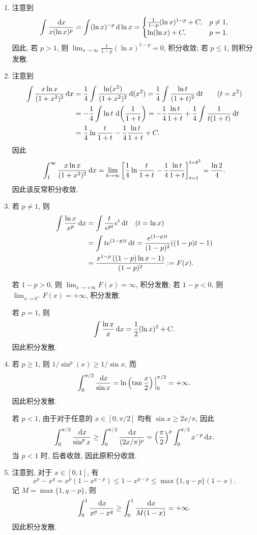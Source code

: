 \documentclass{article}
\begin{document}
\begin{solution}
  \begin{enumerate}[label=(\alph*)]
    \item 注意到
    \[ \int \frac{\,\mathrm{d} x}{x(\ln x)^p} = \int (\ln x)^{-p}\,\mathrm{d} \ln x
    =\begin{cases}
    \frac{1}{1-p}(\ln x)^{1-p}+C, & p\neq 1, \\
    \ln(\ln x)+C, & p=1.
    \end{cases} \]
    因此, 若 \( p>1 \), 则 \( \lim_{x\to\infty} \frac{1}{1-p}(\ln x)^{1-p} = 0 \), 积分收敛; 若 \( p\leq 1 \), 则积分发散.
    \item 注意到
    \begin{align*}
      \int \frac{x\ln x}{(1+x^2)^2}\,\mathrm{d} x
      &= \frac{1}{4} \int \frac{\ln(x^2)}{(1+x^2)^2}\,\mathrm{d}(x^2)
      = \frac{1}{4} \int \frac{\ln t}{(1+t)^2}\,\mathrm{d} t \qquad (t=x^2) \\
      &= -\frac{1}{4} \int \ln t\,\,\mathrm{d}\!\left(\frac{1}{1+t}\right)
      = -\frac{1}{4} \frac{\ln t}{1+t} + \frac{1}{4} \int \frac{1}{t(1+t)}\,\mathrm{d} t \\
      &= \frac{1}{4} \ln \frac{t}{1+t} - \frac{1}{4} \frac{\ln t}{1+t} + C.
    \end{align*}
    因此
    \[
      \int_1^\infty \frac{x\ln x}{(1+x^2)^2}\,\mathrm{d} x
      = \lim_{b\to\infty} \left[\frac{1}{4} \ln \frac{t}{1+t} - \frac{1}{4} \frac{\ln t}{1+t}\right]_{t=1}^{t=b^2}
      = \frac{\ln 2}{4}.
    \]
    因此该反常积分收敛.
    \item 若 \( p\neq 1 \), 则
    \begin{align*}
      \int \frac{\ln x}{x^{p}}\,\mathrm{d} x
      &=\int \frac{t}{e^{p t}}e^{t}\,\mathrm{d} t\quad (t=\ln x) \\
      &=\int te^{(1-p)t}\,\mathrm{d} t
      =\frac{e^{(1-p)t}}{(1-p)^2}((1-p)t-1)\\
      &=\frac{x^{1-p}\left( (1-p)\ln x-1 \right)}{(1-p)^2}
      :=F(x).
    \end{align*}

    若 \( 1-p>0 \), 则 \( \lim_{x\to+\infty}F(x)=\infty \), 积分发散; 若 \( 1-p<0 \), 则 \( \lim_{x\to 0^+}F(x)=+\infty \), 积分发散.

    若 \( p=1 \), 则
    \[
      \int \frac{\ln x}{x}\,\mathrm{d} x = \frac{1}{2}(\ln x)^2+C.
    \]
    因此积分发散.
    \item 若 \( p\ge 1 \), 则 \( 1/\sin^{p}(x)\ge1/\sin x \), 而 
    \[ \int_{0}^{\pi/2}\frac{\,\mathrm{d} x}{\sin x}=\ln\left( \tan \frac{x}{2} \right)\Big|_{0}^{\pi/2} = +\infty. \]
    因此积分发散.

    若 \( p<1 \), 由于对于任意的 \( x\in[0,\pi/2] \) 均有 \( \sin x\geq2x/\pi \), 因此
    \[ \int_{0}^{\pi/2}\frac{\,\mathrm{d} x}{\sin^p x}\geq \int_{0}^{\pi/2}\frac{\,\mathrm{d} x}{(2x/\pi)^p} = \left(\frac{\pi}{2}\right)^p \int_{0}^{\pi/2} x^{-p} \,\mathrm{d} x. \]
    当 \( p<1 \) 时, 后者收敛, 因此原积分收敛.

    \item 注意到, 对于 \( x\in[0,1] \), 有
    \[ x^{p}-x^q=x^p(1-x^{q-p})\leq 1-x^{q-p} \leq \max\{1,q-p\}(1-x). \]
    记 \( M=\max\{1,q-p\} \), 则
    \[ \int_0^1 \frac{\,\mathrm{d} x}{x^p - x^q} \geq \int_0^1 \frac{\,\mathrm{d} x}{M(1-x)} = +\infty. \]
    因此积分发散.
  \end{enumerate}
\end{solution}
\end{document}
